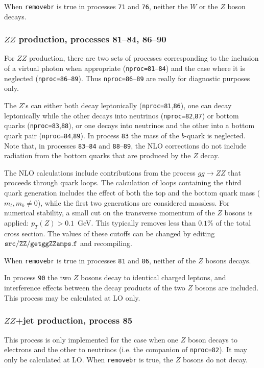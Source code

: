 \documentclass{article}
\begin{document}
When {\tt removebr} is true in processes {\tt 71} and {\tt 76},
neither the $W$ or the $Z$ boson decays.

\subsubsection{$ZZ$ production, processes 81--84, 86--90}

For $ZZ$ production, there are two sets of processes corresponding to the
inclusion of a virtual photon when appropriate ({\tt nproc=81}--{\tt 84})
and the case where it is neglected ({\tt nproc=86}--{\tt 89}).
Thus {\tt nproc=86}--{\tt 89} are really for diagnostic purposes only.

The $Z$'s can either both decay leptonically ({\tt nproc=81},{\tt 86}),
one can decay leptonically while the other decays into neutrinos
({\tt nproc=82},{\tt 87}) or bottom quarks ({\tt nproc=83},{\tt 88}), or
one decays into neutrinos and the other into a bottom quark pair
({\tt nproc=84},{\tt 89}).
In process {\tt 83} the mass of the $b$-quark is neglected. Note that, in processes
{\tt 83}--{\tt 84} and {\tt 88}--{\tt 89}, the NLO corrections do not include
radiation from the bottom quarks that are produced by the $Z$ decay.

The NLO calculations include contributions from the process $gg \to ZZ$
that proceeds through quark loops. The calculation of loops containing the third quark generation
includes the effect of both the top and the bottom quark mass ($m_t,m_b \neq 0$), while the first two
generations are considered massless. For numerical stability, a small cut on the
transverse momentum of the $Z$ bosons is applied: $p_T(Z)>0.1$~GeV.
This typically removes less than $0.1$\% of the total cross section. The
values of these cutoffs can be changed by editing ${\tt src/ZZ/getggZZamps.f}$ 
and recompiling.

When {\tt removebr} is true in processes {\tt 81} and {\tt 86},
neither of the $Z$ bosons decays.

In process {\tt 90} the two $Z$ bosons decay to identical charged leptons,
and interference effects between the decay products of the two $Z$ bosons
are included. This process may be calculated at LO only.

\subsubsection{$ZZ$+jet production, process 85}

This process is only implemented for the case when one $Z$ boson decays to
electrons and the other to neutrinos (i.e. the companion of {\tt nproc=82}).
It may only be calculated at LO. When {\tt removebr} is true, the $Z$ bosons
do not decay.
\end{document}
